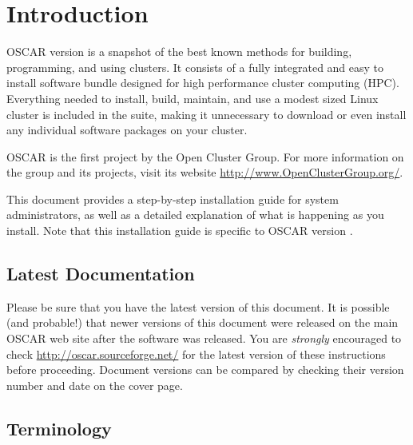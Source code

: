 %
%
%
%
%

\section{Introduction}
OSCAR version \oscarversion is a snapshot of the best known methods
for building, programming, and using clusters. It consists of a
fully integrated and easy to install software bundle designed for
high performance cluster computing (HPC). Everything needed to
install, build, maintain, and use a modest sized Linux cluster is
included in the suite, making it unnecessary to download or even
install any individual software packages on your cluster.

OSCAR is the first project by the Open Cluster Group. For more
information on the group and its projects, visit its website
\url{http://www.OpenClusterGroup.org/}.

This document provides a step-by-step installation guide for system
administrators, as well as a detailed explanation of what is
happening as you install.  Note that this installation guide is
specific to OSCAR version \oscarversion.


\subsection{Latest Documentation}

Please be sure that you have the latest version of this document.  It
is possible (and probable!) that newer versions of this document were
released on the main OSCAR web site after the software was released.
You are {\em strongly} encouraged to check
\url{http://oscar.sourceforge.net/} for the latest version of these
instructions before proceeding.  Document versions can be compared by
checking their version number and date on the cover page.


\subsection{Terminology}

